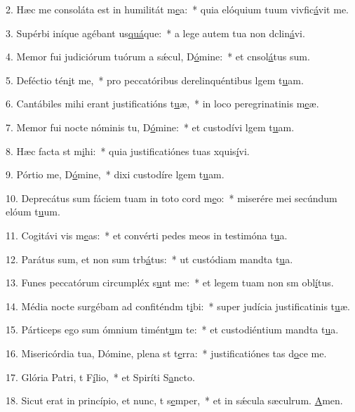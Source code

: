 2. Hæc me consoláta est in humilitát m\uline{e}a:~* quia elóquium tuum vivfic\uline{á}vit me.\par 
3. Supérbi iníque agébant us\uline{quá}que:~* a lege autem tua non dclin\uline{á}vi.\par 
4. Memor fui judiciórum tuórum a sǽcul, D\uline{ó}mine:~* et cnsol\uline{á}tus sum.\par 
5. Deféctio tén\uline{i}t me,~* pro peccatóribus derelinquéntibus lgem t\uline{u}am.\par 
6. Cantábiles mihi erant justificatións t\uline{u}æ,~* in loco peregrinatinis m\uline{e}æ.\par 
7. Memor fui nocte nóminis tu, D\uline{ó}mine:~* et custodívi lgem t\uline{u}am.\par 
8. Hæc facta st m\uline{i}hi:~* quia justificatiónes tuas xquis\uline{í}vi.\par 
9. Pórtio me, D\uline{ó}mine,~* dixi custodíre lgem t\uline{u}am.\par 
10. Deprecátus sum fáciem tuam in toto cord m\uline{e}o:~* miserére mei secúndum elóum t\uline{u}um.\par 
11. Cogitávi vis m\uline{e}as:~* et convérti pedes meos in testimóna t\uline{u}a.\par 
12. Parátus sum, et non sum trb\uline{á}tus:~* ut custódiam mandta t\uline{u}a.\par 
13. Funes peccatórum circumpléx s\uline{u}nt me:~* et legem tuam non sm obl\uline{í}tus.\par 
14. Média nocte surgébam ad confiténdm t\uline{i}bi:~* super judícia justificatinis t\uline{u}æ.\par 
15. Párticeps ego sum ómnium timént\uline{u}m te:~* et custodiéntium mandta t\uline{u}a.\par 
16. Misericórdia tua, Dómine, plena st t\uline{e}rra:~* justificatiónes tas d\uline{o}ce me.\par 
17. Glória Patri, t F\uline{í}lio,~* et Spiríti S\uline{a}ncto.\par 
18. Sicut erat in princípio, et nunc, t s\uline{e}mper,~* et in sǽcula sæculrum. \uline{A}men.\par 
